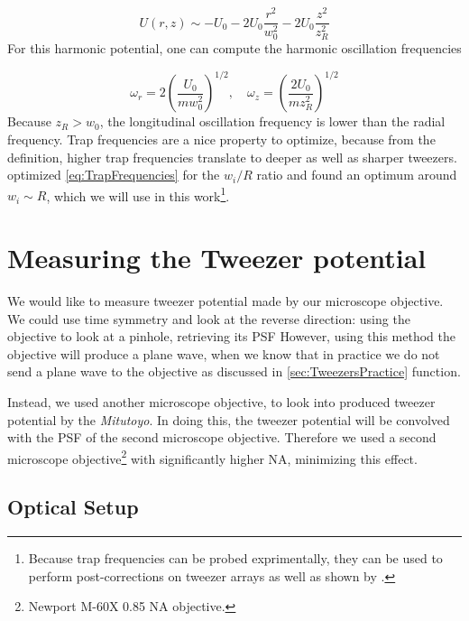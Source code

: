 \begin{equation}\label{eq:ApproximateGaussianPotential}
    U(r,z) \sim -U_0 - 2U_0 \frac{r^2}{w_0^2} - 2U_0 \frac{z^2}{z_R^2}
\end{equation}
For this harmonic potential, one can compute the harmonic oscillation frequencies 

\begin{equation}\label{eq:TrapFrequencies}
    \omega_r = 2\left(\frac{U_0}{m w_0^2}\right)^{1/2}, \quad
    \omega_z= \left(\frac{2 U_0}{m z_R^2}\right)^{1/2}
\end{equation}
Because $z_R > w_0$, the longitudinal oscillation frequency is lower than the radial frequency. 
Trap frequencies are a nice property to optimize, because from the definition, higher trap frequencies translate to deeper as well as sharper tweezers. 
\cite{Madjarov2021} optimized \cref{eq:TrapFrequencies} for the $w_i/R$ ratio and found an optimum around $w_i\sim R$, which we will use in this work\footnote{Because trap frequencies can be probed exprimentally, they can be used to perform post-corrections on tweezer arrays as well as shown by \cite{Ebadi2021}.}.

\section{Measuring the Tweezer potential}\label{sec:MeasuringTweezer}

We would like to measure tweezer potential made by our microscope objective. 
We could use time symmetry and look at the reverse direction: using the objective to look at a pinhole, retrieving its \acf{PSF} \cite{Knottnerus2018,Sortais2007}
However, using this method the objective will produce a plane wave, when we know that in practice we do not send a plane wave to the objective as discussed in \cref{sec:TweezersPractice}
function. 

Instead, we used another microscope objective, to look into produced tweezer potential by the \textit{Mitutoyo}. 
In doing this, the tweezer potential will be convolved with the \ac{PSF} of the second microscope objective\cite{Baumgaertner2017}.
Therefore we used a second microscope objective\footnote{Newport M-60X 0.85 NA objective.} with significantly higher \ac{NA}, minimizing this effect. 

\subsection{Optical Setup}

